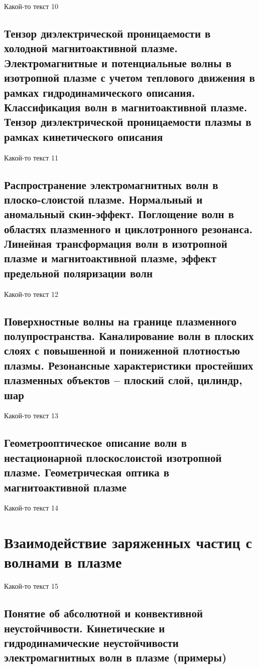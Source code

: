\documentclass[10pt, a4paper]{article}
\numberwithin{equation}{section}
\begin{document}
Какой-то текст 10

\subsection{Тензор диэлектрической проницаемости в холодной магнитоактивной плазме. Электромагнитные и потенциальные волны в изотропной плазме с учетом теплового движения в рамках гидродинамического описания. Классификация волн в магнитоактивной плазме. Тензор диэлектрической проницаемости плазмы в рамках кинетического описания}

Какой-то текст 11

\subsection{Распространение электромагнитных волн в плоско-слоистой плазме. Нормальный и аномальный скин-эффект. Поглощение волн в областях плазменного и циклотронного резонанса. Линейная трансформация волн в изотропной плазме и магнитоактивной плазме, эффект предельной поляризации волн}

Какой-то текст 12

\subsection{Поверхностные волны на границе плазменного полупространства. Каналирование волн в плоских слоях с повышенной и пониженной плотностью плазмы. Резонансные характеристики простейших плазменных объектов – плоский слой, цилиндр, шар}

Какой-то текст 13

\subsection{Геометрооптическое описание волн в нестационарной плоскослоистой изотропной плазме. Геометрическая оптика в магнитоактивной плазме}

Какой-то текст 14

\section{Взаимодействие заряженных частиц с волнами в плазме}

Какой-то текст 15

\subsection{Понятие об абсолютной и конвективной неустойчивости. Кинетические и гидродинамические неустойчивости электромагнитных волн в плазме (примеры)}
\end{document}

